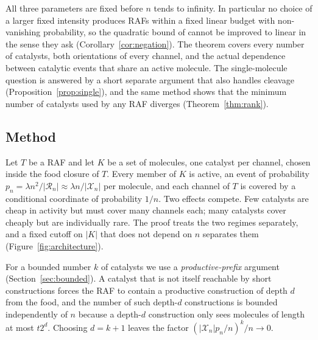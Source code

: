 \documentclass[11pt,a4paper]{article}
\theoremstyle{plain}
\theoremstyle{definition}
\theoremstyle{remark}
\newcommand{\cR}{\mathcal R}
\newcommand{\cX}{\mathcal X}
\begin{document}
All three parameters are fixed before $n$ tends to infinity. In particular no choice of a larger fixed intensity produces RAFs within a fixed linear budget with non-vanishing probability, so the quadratic bound of \cite[Corollary~2]{hordijk2016variable} cannot be improved to linear in the sense they ask (Corollary~\ref{cor:negation}). The theorem covers every number of catalysts, both orientations of every channel, and the actual dependence between catalytic events that share an active molecule. The single-molecule question is answered by a short separate argument that also handles cleavage (Proposition~\ref{prop:single}), and the same method shows that the minimum number of catalysts used by any RAF diverges (Theorem~\ref{thm:rank}).

\subsection{Method}

Let $T$ be a RAF and let $K$ be a set of molecules, one catalyst per channel, chosen inside the food closure of $T$. Every member of $K$ is active, an event of probability $p_n=\lambda n^2/|\cR_n|\approx\lambda n/|\cX_n|$ per molecule, and each channel of $T$ is covered by a conditional coordinate of probability $1/n$. Two effects compete. Few catalysts are cheap in activity but must cover many channels each; many catalysts cover cheaply but are individually rare. The proof treats the two regimes separately, and a fixed cutoff on $|K|$ that does not depend on $n$ separates them (Figure~\ref{fig:architecture}).

For a bounded number $k$ of catalysts we use a \emph{productive-prefix} argument (Section~\ref{sec:bounded}). A catalyst that is not itself reachable by short constructions forces the RAF to contain a productive construction of depth $d$ from the food, and the number of such depth-$d$ constructions is bounded independently of $n$ because a depth-$d$ construction only sees molecules of length at most $t2^d$. Choosing $d=k+1$ leaves the factor $(|\cX_n|p_n/n)^k/n\to 0$.
\end{document}
